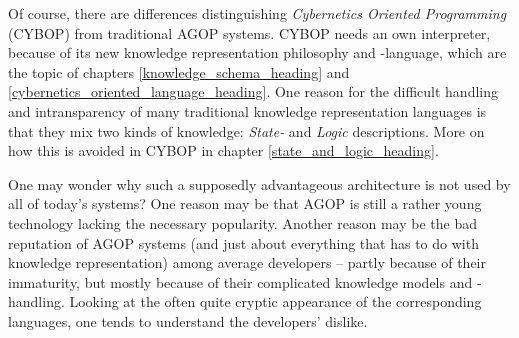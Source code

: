 Of course, there are differences distinguishing
\emph{Cybernetics Oriented Programming} (CYBOP) from traditional AGOP systems.
CYBOP needs an own interpreter, because of its new knowledge representation
philosophy and -language, which are the topic of chapters
\ref{knowledge_schema_heading} and \ref{cybernetics_oriented_language_heading}.
One reason for the difficult handling and intransparency of many traditional
knowledge representation languages is that they mix two kinds of knowledge:
\emph{State-} and \emph{Logic} descriptions. More on how this is avoided in
CYBOP in chapter \ref{state_and_logic_heading}.

One may wonder why such a supposedly advantageous architecture is not used by
all of today's systems? One reason may be that AGOP is still a rather young
technology lacking the necessary popularity. Another reason may be the bad
reputation of AGOP systems (and just about everything that has to do with
knowledge representation) among average developers -- partly because of their
immaturity, but mostly because of their complicated knowledge models and
-handling. Looking at the often quite cryptic appearance of the corresponding
languages, one tends to understand the developers' dislike.
